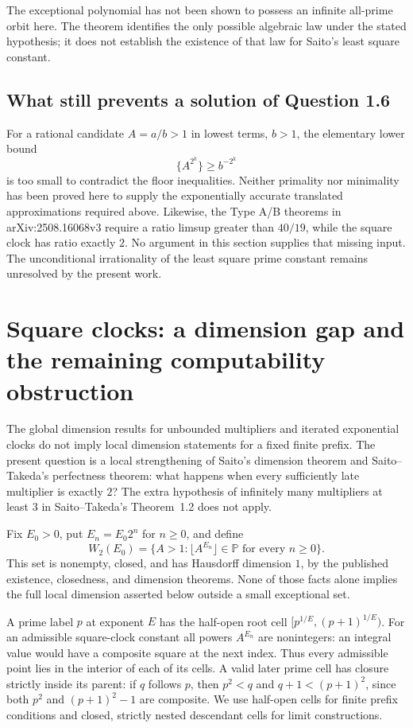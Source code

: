 \documentclass[11pt,a4paper]{article}
\theoremstyle{definition}
\theoremstyle{remark}
\numberwithin{equation}{section}
\begin{document}
The exceptional polynomial has not been shown to possess an infinite
all-prime orbit here.  The theorem identifies the only possible
algebraic law under the stated hypothesis; it does not establish the
existence of that law for Saito's least square constant.

\subsection{What still prevents a solution of Question 1.6}

For a rational candidate $A=a/b>1$ in lowest terms, $b>1$, the elementary
lower bound
\[
 \{A^{2^k}\}\ge b^{-2^k}
\]
is too small to contradict the floor inequalities.  Neither primality
nor minimality has been proved here to supply the exponentially accurate
translated approximations required above.  Likewise, the Type A/B
theorems in arXiv:2508.16068v3 require a ratio limsup greater than
$40/19$, while the square clock has ratio exactly $2$.
No argument in this section supplies that missing input.  The
unconditional irrationality of the least square prime constant remains
unresolved by the present work.


\section{Square clocks: a dimension gap and the remaining computability obstruction}
\label{f13:sqnew:section}

The global dimension results for unbounded multipliers and iterated
exponential clocks do not imply local dimension statements for a fixed
finite prefix. The present question is a local strengthening of Saito's dimension theorem
and Saito--Takeda's perfectness theorem: what happens when every sufficiently
late multiplier is exactly $2$? The extra hypothesis of infinitely many
multipliers at least $3$ in Saito--Takeda's Theorem~1.2 does not apply.

Fix $E_0>0$, put $E_n=E_0 2^n$ for $n\ge0$, and define
\[
 W_2(E_0)=\{A>1:\lfloor A^{E_n}\rfloor\in\mathbb P
                 \text{ for every }n\ge0\}.
\]
This set is nonempty, closed, and has Hausdorff dimension $1$, by the
published existence, closedness, and dimension theorems. None of those
facts alone implies the full local dimension asserted below outside a
small exceptional set.

A prime label $p$ at exponent $E$ has the half-open root cell
$[p^{1/E},(p+1)^{1/E})$. For an admissible square-clock constant all
powers $A^{E_n}$ are nonintegers: an integral value would have a
composite square at the next index. Thus every admissible point lies
in the interior of each of its cells. A valid later prime cell has
closure strictly inside its parent: if $q$ follows $p$, then
$p^2<q$ and $q+1<(p+1)^2$, since both $p^2$ and $(p+1)^2-1$ are
composite. We use half-open cells for finite prefix conditions and
closed, strictly nested descendant cells for limit constructions.
\end{document}
